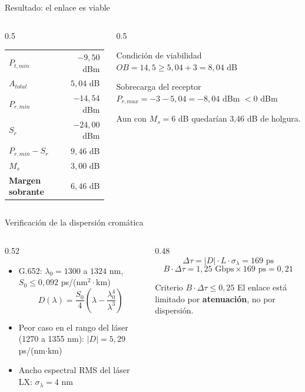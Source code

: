\documentclass[aspectratio=1610]{beamer}
\begin{document}
\begin{frame}{Resultado: el enlace es viable}
  \begin{columns}[T]
    \begin{column}{0.5\textwidth}
      \begin{tabular}{lr}
        \toprule
        $P_{t,min}$ & $-9{,}50$ dBm \\
        $A_{total}$ & $5{,}04$ dB \\
        $P_{r,min}$ & $-14{,}54$ dBm \\
        $S_r$ & $-24{,}00$ dBm \\
        $P_{r,min} - S_r$ & $9{,}46$ dB \\
        $M_s$ & $3{,}00$ dB \\
        \textbf{Margen sobrante} & $6{,}46$ dB \\
        \bottomrule
      \end{tabular}
    \end{column}
    \begin{column}{0.5\textwidth}
      \begin{block}{Condición de viabilidad}
        \centering
        $OB = 14{,}5 \geq 5{,}04 + 3 = 8{,}04$ dB \checkmark
      \end{block}
      \begin{block}{Sobrecarga del receptor}
        \centering
        $P_{r,max} = -3 - 5{,}04 = -8{,}04$ dBm $< 0$ dBm \checkmark
      \end{block}
      \small Aun con $M_s = 6$ dB quedarían 3,46 dB de holgura.
    \end{column}
  \end{columns}
\end{frame}

\begin{frame}{Verificación de la dispersión cromática}
  \begin{columns}[T]
    \begin{column}{0.52\textwidth}
      \begin{itemize}
        \item G.652: $\lambda_0 = 1300$ a $1324$ nm, $S_0 \leq 0{,}092$ ps/(nm$^2\cdot$km)
        \[ D(\lambda) = \frac{S_0}{4}\left(\lambda - \frac{\lambda_0^4}{\lambda^3}\right) \]
        \item Peor caso en el rango del láser (1270 a 1355 nm): $|D| = 5{,}29$ ps/(nm$\cdot$km)
        \item Ancho espectral RMS del láser LX: $\sigma_\lambda = 4$ nm
      \end{itemize}
    \end{column}
    \begin{column}{0.48\textwidth}
      \[ \Delta\tau = |D| \cdot L \cdot \sigma_\lambda = 169 \text{ ps} \]
      \[ B \cdot \Delta\tau = 1{,}25\text{ Gbps} \times 169 \text{ ps} = 0{,}21 \]
      \begin{block}{Criterio $B \cdot \Delta\tau \leq 0{,}25$ \checkmark}
        El enlace está limitado por \textbf{atenuación}, no por dispersión.
      \end{block}
    \end{column}
  \end{columns}
\end{frame}
\end{document}
